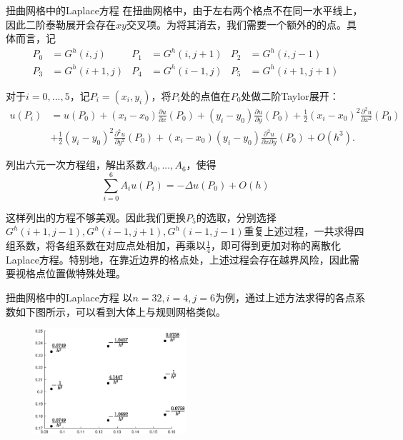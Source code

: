\documentclass[9pt]{beamer}
\begin{document}
\begin{frame}{扭曲网格中的Laplace方程}
\small
在扭曲网格中，由于左右两个格点不在同一水平线上，因此二阶泰勒展开会存在$xy$交叉项。为将其消去，我们需要一个额外的的点。具体而言，记
\begin{align*}
  P_0&=G^h(i,j) & P_1&=G^h(i,j+1) & P_2&=G^h(i,j-1)\\
  P_3&=G^h(i+1,j) & P_4&=G^h(i-1,j) & P_5&=G^h(i+1,j+1)
\end{align*}

\pause
对于$i=0,...,5$，记$P_i=(x_i,y_i)$，将$P_i$处的点值在$P_0$处做二阶Taylor展开：
\begin{align*}
  u(P_i)&=u(P_0)+(x_i-x_0)\frac{\partial u}{\partial x}(P_0)+(y_i-y_0)\frac{\partial u}{\partial y}(P_0)
  +\frac{1}{2}(x_i-x_0)^2\frac{\partial^2 u}{\partial x^2}(P_0) \\
  & +\frac{1}{2}(y_i-y_0)^2\frac{\partial^2 u}{\partial y^2}(P_0)
  +(x_i-x_0)(y_i-y_0)\frac{\partial^2 u}{\partial x \partial y}(P_0)+O(h^3).
\end{align*}

\pause
列出六元一次方程组，解出系数$A_0,...,A_6$，使得
\begin{equation*}
  \sum_{i=0}^6 A_iu(P_i)=-\Delta u(P_0)+O(h)
\end{equation*}

\pause
这样列出的方程不够美观。因此我们更换$P_5$的选取，分别选择$G^h(i+1,j-1),G^h(i-1,j+1),G^h(i-1,j-1)$重复上述过程，一共求得四组系数，将各组系数在对应点处相加，再乘以$\frac{1}{4}$，即可得到更加对称的离散化Laplace方程。特别地，在靠近边界的格点处，上述过程会存在越界风险，因此需要视格点位置做特殊处理。
\end{frame}

\begin{frame}{扭曲网格中的Laplace方程}
以$n=32,i=4,j=6$为例，通过上述方法求得的各点系数如下图所示，可以看到大体上与规则网格类似。

\begin{figure}[H]
  \centering
  \includegraphics[width=0.5\textwidth]{../report/figure/3-2.eps}
\end{figure}
\end{frame}
\end{document}
